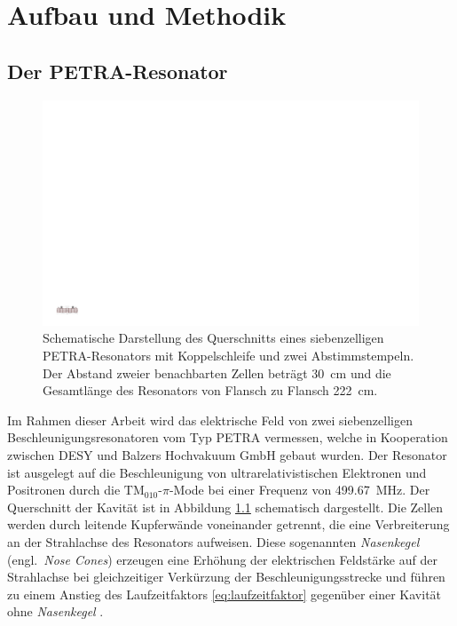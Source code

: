 \chapter{Aufbau und Methodik}
\label{sec:aufbau_und_methodik}

\section{Der PETRA-Resonator}
\label{sec:petra_resonator}
\begin{figure}[htb]
  \centering
  \includegraphics[scale=0.6875]{./figs/cavity/cavity.pdf}
  \caption[Schematische Darstellung des Querschnitts eines siebenzelligen PETRA-Resonators mit Koppelschleife und zwei Abstimmstempeln]{Schematische Darstellung des Querschnitts eines siebenzelligen PETRA-Resonators mit Koppelschleife und zwei Abstimmstempeln. Der Abstand zweier benachbarten Zellen beträgt \SI{30}{\centi\metre} und die Gesamtlänge des Resonators von Flansch zu Flansch \SI{222}{\centi\metre}.}
  \label{fig:petra_cavity}
\end{figure}
Im Rahmen dieser Arbeit wird das elektrische Feld von zwei siebenzelligen Beschleunigungsresonatoren vom Typ PETRA \cite{desy_petra} vermessen, welche in Kooperation zwischen DESY und Balzers Hochvakuum GmbH gebaut wurden.
Der Resonator ist ausgelegt auf die Beschleunigung von ultrarelativistischen Elektronen und Positronen durch die $\mathrm{TM}_{010}\text{-}\pi$-Mode bei einer Frequenz von \SI{499.67}{MHz}.
Der Querschnitt der Kavität ist in Abbildung \ref{fig:petra_cavity} schematisch dargestellt.
Die Zellen werden durch leitende Kupferwände voneinander getrennt, die eine Verbreiterung an der Strahlachse des Resonators aufweisen.
Diese sogenannten \textit{Nasenkegel} (engl.\ \textit{Nose Cones}) erzeugen eine Erhöhung der elektrischen Feldstärke auf der Strahlachse bei gleichzeitiger Verkürzung der Beschleunigungsstrecke und führen zu einem Anstieg des Laufzeitfaktors \eqref{eq:laufzeitfaktor} gegenüber einer Kavität ohne \textit{Nasenkegel} \cite[S.\ 48]{wangler}.

